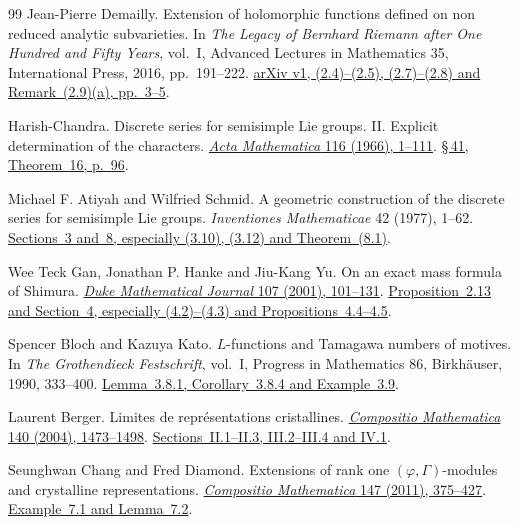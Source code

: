 \begin{thebibliography}{99}
Jean-Pierre Demailly.
Extension of holomorphic functions defined on non reduced analytic
subvarieties.
In \emph{The Legacy of Bernhard Riemann after One Hundred and Fifty Years},
vol.~I, Advanced Lectures in Mathematics 35, International Press, 2016,
pp.~191--222.
\href{https://arxiv.org/pdf/1510.05230v1\#page=3}
{arXiv v1, (2.4)--(2.5), (2.7)--(2.8) and Remark~(2.9)(a), pp.~3--5}.

Harish-Chandra.
Discrete series for semisimple Lie groups. II. Explicit determination of the characters.
\href{https://doi.org/10.1007/BF02392813}{\emph{Acta Mathematica} 116 (1966), 1--111}.
\href{https://repository.ias.ac.in/30833/1/336.pdf\#page=96}
{\S\,41, Theorem~16, p.~96}.

Michael F. Atiyah and Wilfried Schmid.
A geometric construction of the discrete series for semisimple Lie groups.
\emph{Inventiones Mathematicae} 42 (1977), 1--62.
\href{https://www.math.utah.edu/~ptrapa/math-library/schmid/atiyah-schmid.pdf}
{Sections~3 and~8, especially (3.10), (3.12) and Theorem~(8.1)}.

Wee Teck Gan, Jonathan P. Hanke and Jiu-Kang Yu.
On an exact mass formula of Shimura.
\href{https://doi.org/10.1215/S0012-7094-01-10716-3}{\emph{Duke Mathematical Journal} 107 (2001), 101--131}.
\href{https://web.math.princeton.edu/~jonhanke/Web-02/Mass-Formula-of-Shimura/shimura-mass.pdf}
{Proposition~2.13 and Section~4, especially (4.2)--(4.3) and Propositions~4.4--4.5}.

Spencer Bloch and Kazuya Kato.
\(L\)-functions and Tamagawa numbers of motives.
In \emph{The Grothendieck Festschrift}, vol.~I,
Progress in Mathematics 86, Birkh\"auser, 1990, 333--400.
\href{https://math.stanford.edu/~conrad/BSDseminar/refs/BKTamagawa.pdf\#page=23}
{Lemma~3.8.1, Corollary~3.8.4 and Example~3.9}.

Laurent Berger.
Limites de repr\'esentations cristallines.
\href{https://doi.org/10.1112/S0010437X04000879}
{\emph{Compositio Mathematica} 140 (2004), 1473--1498}.
\href{https://perso.ens-lyon.fr/laurent.berger/articles/article06.pdf}
{Sections~II.1--II.3, III.2--III.4 and IV.1}.

Seunghwan Chang and Fred Diamond.
Extensions of rank one \((\varphi,\Gamma)\)-modules and crystalline
representations. \href{https://doi.org/10.1112/S0010437X1000504X}
{\emph{Compositio Mathematica} 147 (2011), 375--427}.
\href{https://arxiv.org/pdf/0910.2371v2\#page=41}
{Example~7.1 and Lemma~7.2}.


\end{thebibliography}
